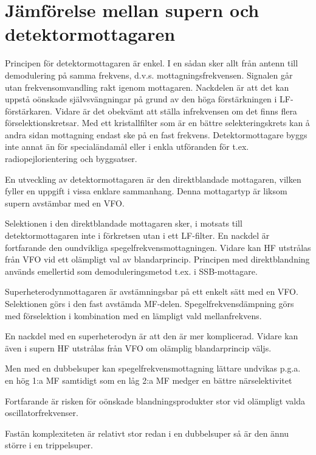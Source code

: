 \section{Jämförelse mellan supern och detektormottagaren}
\label{superheterojämförelse}

Principen för detektormottagaren är enkel. I en sådan sker allt från
antenn till demodulering på samma frekvens,
d.v.s. mottagningsfrekvensen. Signalen går utan frekvensomvandling
rakt igenom mottagaren. Nackdelen är att det kan uppstå oönskade
självsvängningar på grund av den höga förstärkningen i
LF-förstärkaren. Vidare är det obekvämt att ställa infrekvensen om det
finns flera förselektionskretsar. Med ett kristallfilter som är en
bättre selekteringskrets kan å andra sidan mottagning endast ske på en
fast frekvens. Detektormottagare byggs inte annat än för
specialändamål eller i enkla utföranden för
t.ex. radiopejlorientering och byggsatser.

En utveckling av detektormottagaren är den direktblandade mottagaren,
vilken fyller en uppgift i vissa enklare sammanhang.  Denna mottagartyp
är liksom supern avstämbar med en VFO.

Selektionen i den direktblandade mottagaren sker, i motsats till
detektormottagaren inte i förkretsen utan i ett LF-filter. En nackdel
är fortfarande den oundvikliga spegelfrekvensmottagningen. Vidare kan
HF utstrålas från VFO vid ett olämpligt val av
blandarprincip. Principen med direktblandning används emellertid som
demoduleringsmetod t.ex. i SSB-mottagare.

Superheterodynmottagaren är avstämningsbar på ett enkelt sätt med en
VFO. Selektionen görs i den fast avstämda
MF-delen. Spegelfrekvensdämpning görs med förselektion i kombination
med en lämpligt vald mellanfrekvens.

En nackdel med en superheterodyn är att den är mer komplicerad. Vidare
kan även i supern HF utstrålas från VFO om olämplig blandarprincip
väljs.

Men med en dubbelsuper kan spegelfrekvensmottagning lättare undvikas
p.g.a.  en hög 1:a MF samtidigt som en låg 2:a MF medger en bättre
närselektivitet

Fortfarande är risken för oönskade blandningsprodukter stor vid
olämpligt valda oscillatorfrekvenser.

Fastän komplexiteten är relativt stor redan i en dubbelsuper så är den
ännu större i en trippelsuper.
